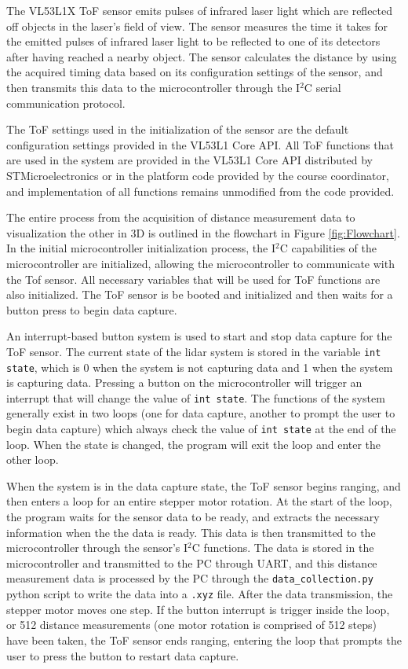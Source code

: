 \documentclass[12pt]{article}
\begin{document}
The VL53L1X ToF sensor emits pulses of infrared laser light which are reflected off objects in the laser's field of view. The sensor measures the time it takes for the emitted pulses of infrared laser light to be reflected to one of its detectors after having reached a nearby object.  The sensor calculates the distance by using the acquired timing data based on its configuration settings of the sensor, and then transmits this data to the microcontroller through the I$^2$C serial communication protocol.

The ToF settings used in the initialization of the sensor are the default configuration settings provided in the VL53L1 Core API. All ToF functions that are used in the system are provided in the VL53L1 Core API  distributed by STMicroelectronics or in the platform code provided by the course coordinator, and implementation of all functions remains unmodified from the code provided.

The entire process from the acquisition of distance measurement data to visualization the other in 3D is outlined in the flowchart in Figure \ref{fig:Flowchart}. In the initial microcontroller initialization process, the I$^2$C capabilities of the microcontroller are initialized, allowing the microcontroller to communicate with the Tof sensor. All necessary variables that will be used for ToF functions are also initialized. The ToF sensor is be booted and initialized and then waits for a button press to begin data capture.

An interrupt-based button system is used to start and stop data capture for the ToF sensor. The current state of the lidar system is stored in the variable \texttt{int state}, which is 0 when the system is not capturing data and 1 when the system is capturing data. Pressing a button on the microcontroller will trigger an interrupt that will change the value of \texttt{int state}. The functions of the system generally exist in two loops (one for data capture, another to prompt the user to begin data capture) which always check the value of \texttt{int state} at the end of the loop. When the state is changed, the program will exit the loop and enter the other loop.

When the system is in the data capture state, the ToF sensor begins ranging, and then enters a loop for an entire stepper motor rotation. At the start of the loop, the program waits for the sensor data to be ready, and extracts the necessary information when the the data is ready. This data is then transmitted to the microcontroller through the sensor's I$^2$C functions. The data is stored in the microcontroller and transmitted to the PC through UART, and this distance measurement data is processed by the PC through the \texttt{data\_collection.py} python script to write the data into a \texttt{.xyz} file. After the data transmission, the stepper motor moves one step. If the button interrupt is trigger inside the loop, or 512 distance measurements (one motor rotation is comprised of 512 steps) have been taken, the ToF sensor ends ranging, entering the loop that prompts the user to press the button to restart data capture.
\end{document}
